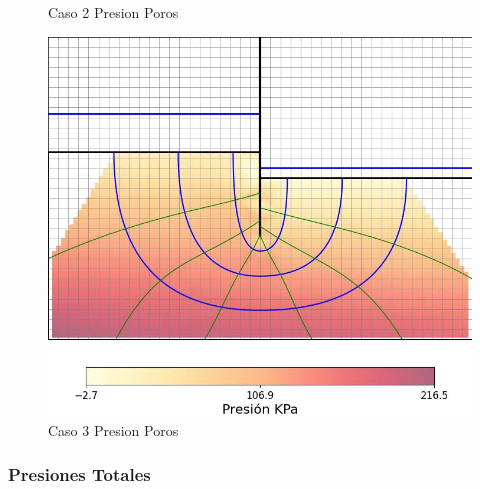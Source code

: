 \begin{figure}[H]
\begin{minipage}{0.32\textwidth}
        \caption{Caso 2 Presion Poros}
    \end{minipage}
    \begin{minipage}{0.32\textwidth}
        \centering
        \includegraphics[width=\textwidth]{GRAFICOS/caso_3_presion_poros.jpg}
        \caption{Caso 3 Presion Poros}
    \end{minipage}
\end{figure}

\subsubsection{Presiones Totales}

